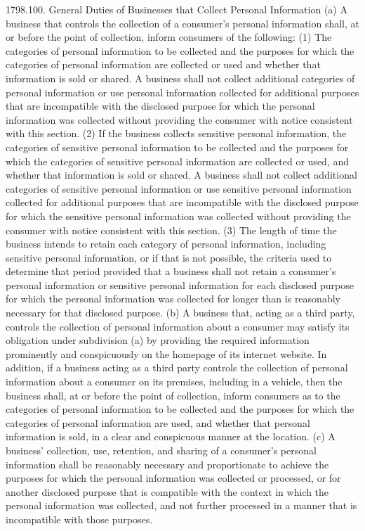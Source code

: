 1798.100.  General Duties of Businesses that Collect Personal Information
(a) A business that controls the collection of a consumer’s personal information shall, at or before the point of collection, inform consumers of the following:
(1) The categories of personal information to be collected and the purposes for which the categories of personal information are collected or used and whether that information is sold or shared. A business shall not collect additional categories of personal information or use personal information collected for additional purposes that are incompatible with the disclosed purpose for which the personal information was collected without providing the consumer with notice consistent with this section.
(2) If the business collects sensitive personal information, the categories of sensitive personal information to be collected and the purposes for which the categories of sensitive personal information are collected or used, and whether that information is sold or shared. A business shall not collect additional categories of sensitive personal information or use sensitive personal information collected for additional purposes that are incompatible with the disclosed purpose for which the sensitive personal information was collected without providing the consumer with notice consistent with this section.
(3) The length of time the business intends to retain each category of personal information, including sensitive personal information, or if that is not possible, the criteria used to determine that period provided that a business shall not retain a consumer’s personal information or sensitive personal information for each disclosed purpose for which the personal information was collected for longer than is reasonably necessary for that disclosed purpose.
(b) A business that, acting as a third party, controls the collection of personal information about a consumer may satisfy its obligation under subdivision (a) by providing the required information prominently and conspicuously on the homepage of its internet website. In addition, if a business acting as a third party controls the collection of personal information about a consumer on its premises, including in a vehicle, then the business shall, at or before the point of collection, inform consumers as to the categories of personal information to be collected and the purposes for which the categories of personal information are used, and whether that personal information is sold, in a clear and conspicuous manner at the location.
(c) A business’ collection, use, retention, and sharing of a consumer’s personal information shall be reasonably necessary and proportionate to achieve the purposes for which the personal information was collected or processed, or for another disclosed purpose that is compatible with the context in which the personal information was collected, and not further processed in a manner that is incompatible with those purposes.
